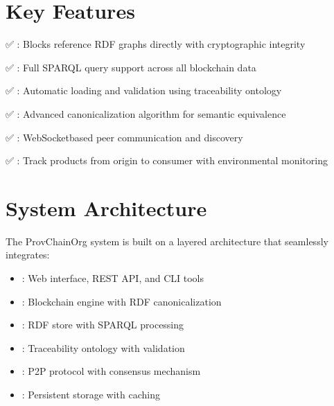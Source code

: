 \documentclass[letterpaper,10pt,english]{sphinxmanual}
\begin{document}
\chapter{Key Features}
\label{\detokenize{index:key-features}}
\sphinxAtStartPar
✅ : Blocks reference RDF graphs directly with cryptographic integrity

\sphinxAtStartPar
✅ : Full SPARQL query support across all blockchain data

\sphinxAtStartPar
✅ : Automatic loading and validation using traceability ontology

\sphinxAtStartPar
✅ : Advanced canonicalization algorithm for semantic equivalence

\sphinxAtStartPar
✅ : WebSocket\sphinxhyphen{}based peer communication and discovery

\sphinxAtStartPar
✅ : Track products from origin to consumer with environmental monitoring


\chapter{System Architecture}
\label{\detokenize{index:system-architecture}}
\sphinxAtStartPar
The ProvChainOrg system is built on a layered architecture that seamlessly integrates:
\begin{itemize}
\item {} 
\sphinxAtStartPar
{}: Web interface, REST API, and CLI tools

\item {} 
\sphinxAtStartPar
{}: Blockchain engine with RDF canonicalization

\item {} 
\sphinxAtStartPar
{}: RDF store with SPARQL processing

\item {} 
\sphinxAtStartPar
{}: Traceability ontology with validation

\item {} 
\sphinxAtStartPar
{}: P2P protocol with consensus mechanism

\item {} 
\sphinxAtStartPar
{}: Persistent storage with caching

\end{itemize}
\end{document}
